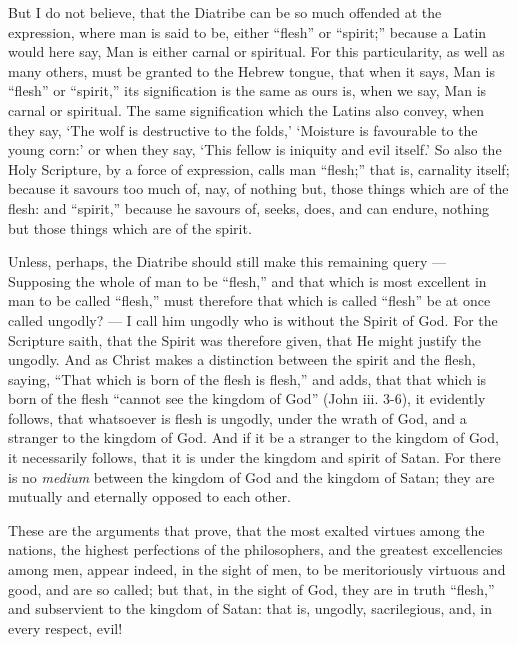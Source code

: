 But I do not believe, that the Diatribe can be so much offended at the expression, where man is said to be, either “flesh” or “spirit;” because a Latin would here say, Man is either carnal or spiritual. For this particularity, as well as many others, must be granted to the Hebrew tongue, that when it says, Man is “flesh” or “spirit,” its signification is the same as ours is, when we say, Man is carnal or spiritual. The same signification which the Latins also convey, when they say, ‘The wolf is destructive to the folds,’ ‘Moisture is favourable to the young corn:’ or when they say, ‘This fellow is iniquity and evil itself.’ So also the Holy Scripture, by a force of expression, calls man “flesh;” that is, carnality itself; because it savours too much of, nay, of nothing but, those things which are of the flesh: and “spirit,” because he savours of, seeks, does, and can endure, nothing but those things which are of the spirit.

Unless, perhaps, the Diatribe should still make this remaining query — Supposing the whole of man to be “flesh,” and that which is most excellent in man to be called “flesh,” must therefore that which is called “flesh” be at once called ungodly? — I call him ungodly who is without the Spirit of God. For the Scripture saith, that the Spirit was therefore given, that He might justify the ungodly. And as Christ makes a distinction between the spirit and the flesh, saying, “That which is born of the flesh is flesh,” and adds, that that which is born of the flesh “cannot see the kingdom of God” (John iii. 3-6), it evidently follows, that whatsoever is flesh is ungodly, under the wrath of God, and a stranger to the kingdom of God. And if it be a stranger to the kingdom of God, it necessarily follows, that it is under the kingdom and spirit of Satan. For there is no \emph{medium }between the kingdom of God and the kingdom of Satan; they are mutually and eternally opposed to each other.

These are the arguments that prove, that the most exalted virtues among the nations, the highest perfections of the philosophers, and the greatest excellencies among men, appear indeed, in the sight of men, to be meritoriously virtuous and good, and are so called; but that, in the sight of God, they are in truth “flesh,” and subservient to the kingdom of Satan: that is, ungodly, sacrilegious, and, in every respect, evil!


